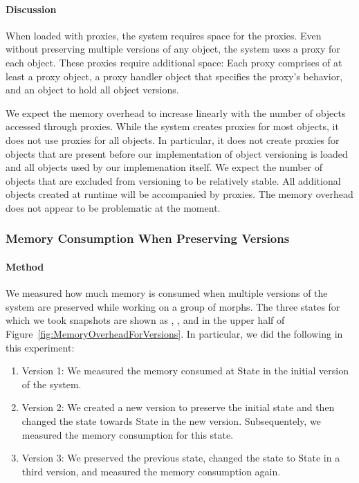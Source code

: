 \paragraph{Discussion}
When loaded with proxies, the system requires space for the proxies.
Even without preserving multiple versions of any object, the system
uses a proxy for each object.  These proxies require additional space:
Each proxy comprises of at least a proxy object, a proxy handler
object that specifies the proxy's behavior, and an object to hold all
object versions.

We expect the memory overhead to increase linearly with the number of
objects accessed through proxies.  While the system creates proxies
for most objects, it does not use proxies for all objects.  In
particular, it does not create proxies for objects that are present
before our implementation of object versioning is loaded and all
objects used by our implemenation itself.  We expect the number of
objects that are excluded from versioning to be relatively stable.
All additional objects created at runtime will be accompanied by
proxies. The memory overhead does not appear to be problematic at the
moment.


\subsubsection{Memory Consumption When Preserving Versions}

\paragraph{Method}
We measured how much memory is consumed when multiple versions of the
system are preserved while working on a group of morphs.  The three
states for which we took snapshots are shown as ,
, and  in the upper half of
Figure~\ref{fig:MemoryOverheadForVersions}.  In particular, we did the
following in this experiment:
\begin{enumerate}
\item Version 1: We measured the memory consumed at State 
  in the initial version of the system.
\item Version 2: We created a new version to preserve the initial
  state and then changed the state towards State  in the
  new version. Subsequentely, we measured the memory consumption for
  this state.
\item Version 3: We preserved the previous state, changed the state to
  State  in a third version, and measured the memory
  consumption again.
\end{enumerate}

